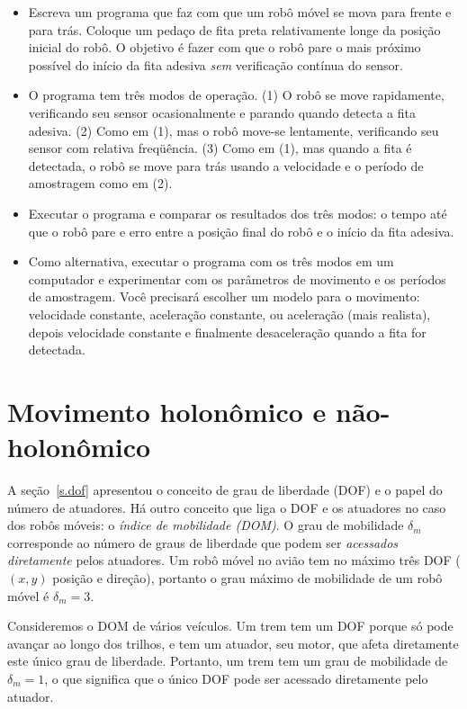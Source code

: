 {\begin{framed}
\begin{itemize}
\item Escreva um programa que faz com que um robô móvel se mova para frente e para trás. Coloque um pedaço de fita preta relativamente longe da posição inicial do robô. O objetivo é fazer com que o robô pare o mais próximo possível do início da fita adesiva \emph{sem} verificação contínua do sensor. 
\item O programa tem três modos de operação. (1) O robô se move rapidamente, verificando seu sensor ocasionalmente e parando quando detecta a fita adesiva. (2) Como em (1), mas o robô move-se lentamente, verificando seu sensor com relativa freqüência. (3) Como em (1), mas quando a fita é detectada, o robô se move para trás usando a velocidade e o período de amostragem como em (2).
\item Executar o programa e comparar os resultados dos três modos: o tempo até que o robô pare e erro entre a posição final do robô e o início da fita adesiva.
\item Como alternativa, executar o programa com os três modos em um computador e experimentar com os parâmetros de movimento e os períodos de amostragem. Você precisará escolher um modelo para o movimento: velocidade constante, aceleração constante, ou aceleração (mais realista), depois velocidade constante e finalmente desaceleração quando a fita for detectada.
\end{itemize}
\end{framed}



\section{Movimento holonômico e não-holonômico}\label{s.holonomic}

A seção~\ref{s.dof} apresentou o conceito de grau de liberdade (DOF) e o papel do número de atuadores. Há outro conceito que liga o DOF e os atuadores no caso dos robôs móveis: o \emph{índice de mobilidade (DOM)}. O grau de mobilidade $\delta_m$ corresponde ao número de graus de liberdade que podem ser \emph{acessados diretamente} pelos atuadores. Um robô móvel no avião tem no máximo três DOF ($(x,y)$ posição e direção), portanto o grau máximo de mobilidade de um robô móvel é $\delta_m = 3$.

Consideremos o DOM de vários veículos. Um trem tem um DOF porque só pode avançar ao longo dos trilhos, e tem um atuador, seu motor, que afeta diretamente este único grau de liberdade. Portanto, um trem tem um grau de mobilidade de $\delta_m = 1$, o que significa que o único DOF pode ser acessado diretamente pelo atuador.

}

